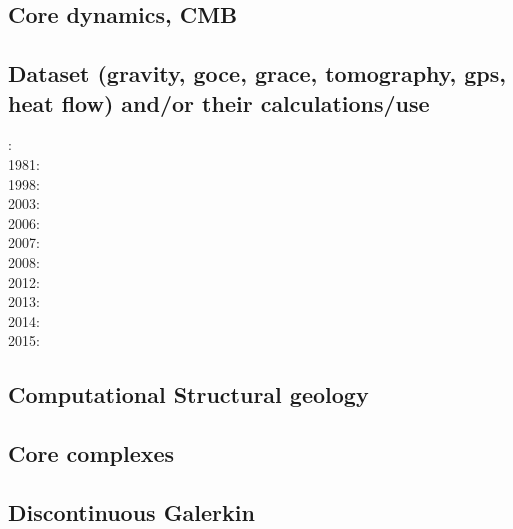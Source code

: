 \subsection*{Core dynamics, CMB}

\cite{hayu96}
\cite{lahb08}

\subsection*{Dataset (gravity, goce, grace, tomography, gps, heat flow) 
and/or their calculations/use}

: \cite{rola77}\\
1981: \cite{dzan81}\\
1998: \cite{bisp98}\\
2003: \cite{krhh03}\cite{sosi03}\\
2006: \cite{masr06}\\
2007: \cite{mitk07}\\
2008: \cite{zhou08}\cite{zhou08}\\
2012: \cite{hawj12}\cite{resa12}\cite{hawj12}\cite{fesw12}\\
2013: \cite{ress13}\cite{ebbf13}\cite{davi13}\\
2014: \cite{paml14}\cite{ebbf14}\cite{krbk14}\\
2015: \cite{boem15}

\subsection*{Computational Structural geology}

\noindent
\cite{acgf00}
\cite{trla00}
\cite{masc01}
\cite{manc08}

\subsection*{Core complexes}

\cite{lehm12}

\subsection*{Discontinuous Galerkin}

